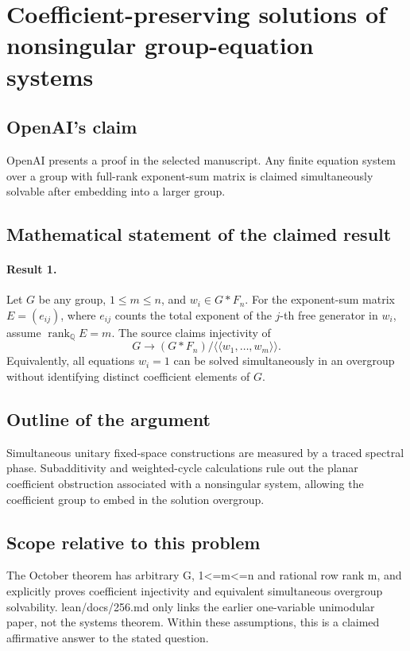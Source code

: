 \documentclass[11pt]{article}
\begin{document}
\section*{Coefficient-preserving solutions of nonsingular group-equation systems}

\subsection{OpenAI's claim}
OpenAI presents a proof in the selected manuscript. Any finite equation system over a group with full-rank exponent-sum matrix is claimed simultaneously solvable after embedding into a larger group.

\subsection{Mathematical statement of the claimed result}
\paragraph{Result 1.} Let \(G\) be any group, \(1\le m\le n\), and \(w_i\in G*F_n\). For the exponent-sum matrix \(E=(e_{ij})\), where \(e_{ij}\) counts the total exponent of the \(j\)-th free generator in \(w_i\), assume \(\operatorname{rank}_{\mathbb Q}E=m\). The source claims injectivity of
\[
 G\longrightarrow (G*F_n)/\langle\!\langle w_1,\ldots,w_m\rangle\!\rangle.
\]
Equivalently, all equations \(w_i=1\) can be solved simultaneously in an overgroup without identifying distinct coefficient elements of \(G\).

\subsection{Outline of the argument}
Simultaneous unitary fixed-space constructions are measured by a traced spectral phase. Subadditivity and weighted-cycle calculations rule out the planar coefficient obstruction associated with a nonsingular system, allowing the coefficient group to embed in the solution overgroup.

\subsection{Scope relative to this problem}
The October theorem has arbitrary G, 1<=m<=n and rational row rank m, and explicitly proves coefficient injectivity and equivalent simultaneous overgroup solvability. lean/docs/256.md only links the earlier one-variable unimodular paper, not the systems theorem. Within these assumptions, this is a claimed affirmative answer to the stated question.
\end{document}
